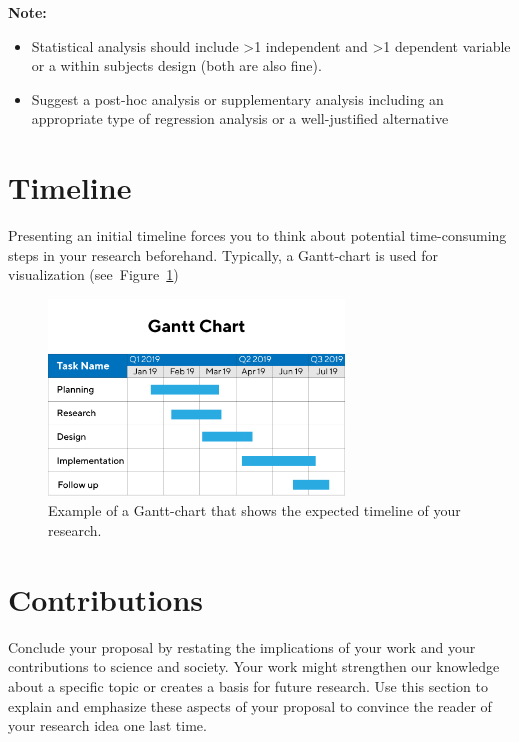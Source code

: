 \documentclass[10pt,a4paper]{article}
\begin{document}
\textbf{Note:}
\begin{itemize}
    \item Statistical analysis should include >1 independent and >1 dependent variable or a within subjects design (both are also fine). 
    \item Suggest a post-hoc analysis or supplementary analysis including an appropriate type of regression analysis or a well-justified alternative
\end{itemize}

\section{Timeline}
Presenting an initial timeline forces you to think about potential time-consuming steps in your research beforehand. Typically, a Gantt-chart is used for visualization (see~Figure~\ref{fig:gantt})

\begin{figure}[hbtp]
    \centering
    \includegraphics[width=0.7\textwidth]{figures/Gantt-chart.png}
    \caption{Example of a Gantt-chart that shows the expected timeline of your research.}
    \label{fig:gantt}
\end{figure}

\section{Contributions}
Conclude your proposal by restating the implications of your work and your contributions to science and society. Your work might strengthen our knowledge about a specific topic or creates a basis for future research. Use this section to explain and emphasize these aspects of your proposal to convince the reader of your research idea one last time.

\printbibliography
\end{document}
